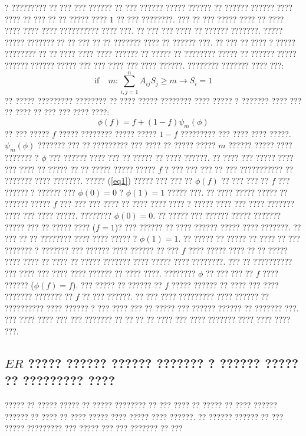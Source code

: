 ? ????????? ?? ??? ??? ?????? ?? ??? ?????? ????? ?????? ?? ?????? ?????? ???? ???? ?? ??? ?? ?? ????? ???? $1$ ?? ??? ????????.
??? ?? ??? ????? ???? ?? ???? ???? ???? ???? ?????????? ???? ???. ?? ??? ??? ???? ?? ?????? ???????. ????? ????? ??????? ?? ?? ??? ?? ?? ??????? ???? ?? ?????? ???. ?? ??? ?? ???? ? ????? ???????? ?? ?? ???? ???? ???? ?????? ?? ????? ?? ???????? ????? ?? ?????? ????? ?????? ?????? ????? ??? ??? ???? ??? ???? ??????. ???????? ??????? ???? ???:  
\begin{equation}
\text{if}~~~~~m: \sum_{i , j=1}^{n} A_{ij}S_{j}\geq m \longrightarrow S_{i} = 1
\end{equation}
?? ????? ????????? ???????? ?? ???? ????? ???????? ???? ????? ? ??????? ???? ??? ?? ???? ?? ??? ??? ???? ????:
\begin{equation}
\phi(f) = f + (1-f)\psi_{m}(\phi) \label{eq1}
\end{equation}
?? ??? ????? $f$ ????? ???????? ????? ????? $1-f$ ????????? ??? ???? ???? ?????. $\psi_{m}(\phi)$ ??????? ??? ?? ????????? ??? ???? ?? ????? ????? $m$ ?????? ????? ???? ??????? ? $\phi$ ??? ?????? ???? ??? ?? ????? ?? ???? ??????. ?? ???? ??? ????? ???? ??? ???? ?? ????? ?? ?? ????? ?????  ????? $f$ ? ??? ??? ??? ?? ??? ??????????? ?? ??????? ???? ???????. ????? (\ref{eq1}) ????? ??? ??? ?? $\phi(f)$ ?? ??? ??? ?? $f$ ??? ?????? ? ?????? ???  
$\phi(0) = 0$ ? $\phi(1) = 1$ ????? ???. ?? ???? ????? ????? ?? ?????? ????? $f$ ??? ??? ??? ???? ?? ???? ???? ???? ? ????? ???? ??? ???? ??????? ???? ??? ???? ?????. ???????? $\phi(0) = 0$. ?? ????? ??? ?????? ????? ??????? ????? ??? ?? ????? ???? ($f = 1$)? ??? ?????? ?? ???? ?????? ????? ???? ???????. ?? ??? ?? ?? ???????? ???? ???? ????? ? $\phi(1) = 1 $. ?? ????? ?? ????? ?? ???? ?? ??? ??????? ? ??????? ??? ?????? ???? ?????? ?? ??? $f$ ???? ????? ???? ?? ?? ????? ???? ???? ?? ???? ?? ?????  ??????? ???? ????? ???? ????????. ??? ?? ?????????? ??? ???? ??? ???? ????  ?????? ?? ???? ????. ???????? $\phi$ ?? ??? ??? ?? $f$ ???? ?????? ($\phi(f) = f$). ??? ????? ?? ?????? ?? $f$ ????? ?????? ?? ???? ??? ???? ??????? ??????? ?? $f$ ?? ??? ??????. ?? ??? ???? ????????? ???? ?????? ?? ?????????? ???? ?????? ? ??? ???? ??? ?? ????? ??? ?????? ?????? ?? ??????? ???. ??? ???? ???? ??? ??? ??????? ?? ?? ??  ?? ???? ??? ???? ??????? ???? ???? ???? ???.



\subsection{$ER$ ????? ?????? ?????? ??????? ? ?????? ????? ?? ????????? ????}
????? ?? ????? ????? ?? ????? ???????? ?? ??? ???? ?? ????? ?? ???? ?????? ?????? ?? ???? ?? ???? ????? ???? ????? ???? ??????. ?? ?????? ?????? ?? ??? ????? ????????? ??? ????? ??? ??? ??????? ?? ???


